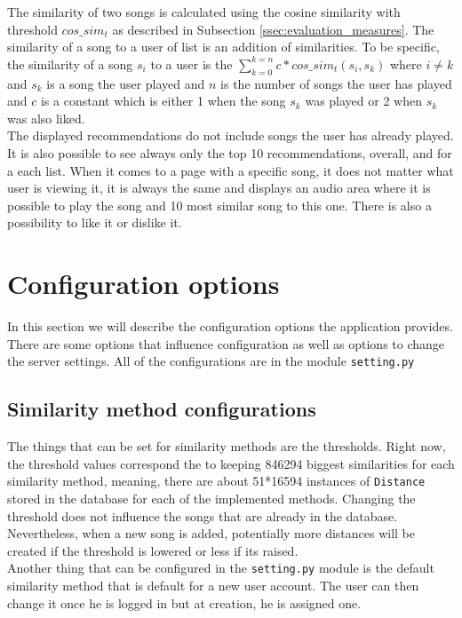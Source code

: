 The similarity of two songs is calculated using the cosine similarity with threshold $cos\_sim_t$ as described in Subsection
\ref{ssec:evaluation_measures}. The similarity of a song to a user of list is an addition of similarities. To be specific, the similarity of a song $s_i$ to a user is the $ \sum_{k=0}^{k=n} c*cos\_sim_t(s_i, s_k) $  where $ i \neq k $ and $ s_k $ is a song the user played and $n$ is the number of songs the user has played and $c$ is a constant which is either 1 when the song $s_k$ was played or 2 when $s_k$ was also liked. \\
The displayed recommendations do not include songs the user has already played. It is also possible to see always only the top 10 recommendations, overall, and for a each list. When it comes to a page with a specific song, it does not matter what user is viewing it, it is always the same and displays an audio area where it is possible to play the song and 10 most similar song to this one. There is also a possibility to like it or dislike it.\\ 

\section{Configuration options}\label{sec:configurations}

In this section we will describe the configuration options the application provides. There are some options that influence configuration as well as options to change the server settings. All of the configurations are in the module \texttt{setting.py}

\subsection{Similarity method configurations}
The things that can be set for similarity methods are the thresholds. Right now, the threshold values correspond the to keeping 846294 biggest similarities for each similarity method, meaning, there are about 51*16594 instances of \texttt{Distance} stored in the database for each of the implemented methods. Changing the threshold does not influence the songs that are already in the database. Nevertheless, when a new song is added, potentially more distances will be created if the threshold is lowered or less if its raised. \\
Another thing that can be configured in the \texttt{setting.py} module is the default similarity method that is default for a new user account. The user can then change it once he is logged in but at creation, he is assigned one.


